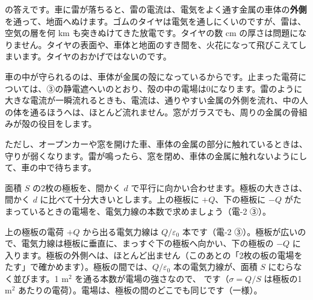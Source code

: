 \label{ph:電-3:hatena}\bkhatenaref の答えです。車に雷が落ちると、雷の電流は、電気をよく通す金属の車体の\textbf{外側}を通って、地面へぬけます。ゴムのタイヤは電気を通しにくいのですが、雷は、空気の層を何 km も突きぬけてきた放電です。タイヤの数 cm の厚さは問題になりません。タイヤの表面や、車体と地面のすき間を、火花になって飛びこえてしまいます。タイヤのおかげではないのです。

車の中が守られるのは、車体が金属の殻になっているからです。止まった電荷については、③の静電遮へいのとおり、殻の中の電場は0になります。雷のように大きな電流が一瞬流れるときも、電流は、通りやすい金属の外側を流れ、中の人の体を通るほうへは、ほとんど流れません。窓がガラスでも、周りの金属の骨組みが殻の役目をします。

ただし、オープンカーや窓を開けた車、車体の金属の部分に触れているときは、守りが弱くなります。雷が鳴ったら、窓を閉め、車体の金属に触れないようにして、車の中で待ちます。

\begin{phmodel}[導体の性質]
\end{phmodel}

\label{ph:電-3:sec4}
面積 $S$ の2枚の極板を、間かく $d$ で平行に向かい合わせます。極板の大きさは、間かく $d$ に比べて十分大きいとします。上の極板に $+Q$、下の極板に $-Q$ がたまっているときの電場を、電気力線の本数で求めましょう（電-2 ③）。

上の極板の電荷 $+Q$ から出る電気力線は $Q/\varepsilon_0$ 本です（電-2 ③）。極板が広いので、電気力線は極板に垂直に、まっすぐ下の極板へ向かい、下の極板の $-Q$ に入ります。極板の外側へは、ほとんど出ません（このあとの「2枚の板の電場をたす」で確かめます）。極板の間では、$Q/\varepsilon_0$ 本の電気力線が、面積 $S$ にむらなく並びます。1 m$^2$ を通る本数が電場の強さなので、
です（$\sigma=Q/S$ は極板の1 m$^2$ あたりの電荷）。電場は、極板の間のどこでも同じです（一様）。

